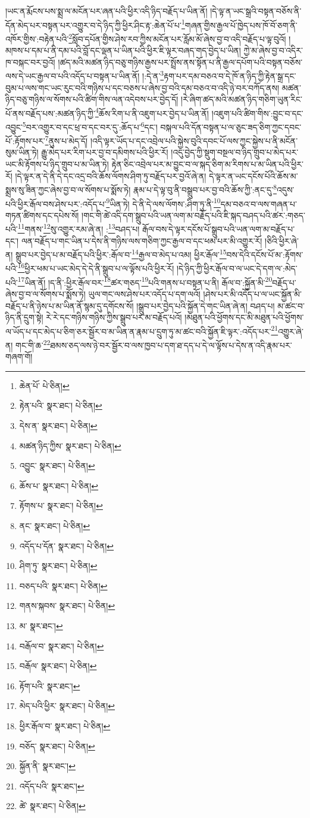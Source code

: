 །ཡང་ན་རྨོངས་པས་སྨྲ་ལ་མངོན་པར་ཞན་པའི་ཕྱིར་འདི་ཉིད་བརྗོད་པ་ཡིན་ནོ། །དེ་ལྟ་ན་ཡང་སྒྲའི་བསྟན་བཅོས་ནི་དོན་མེད་པར་བསྟན་པར་འགྱུར་བ་དེ་ཉིད་ཀྱི་ཕྱིར་ཤིང་རྟ་:ཆེན་པོ་པ་\footnote{ཆེན་པོ་  པེ་ཅིན། }གཞན་གྱིས་རྒྱལ་པོ་ཁྱེད་པས་ཁོ་བོ་ཅག་ནི་འཁོར་གྱིས་:བརྟེན་པའི་\footnote{རྟེན་པའི་  སྣར་ཐང་།  པེ་ཅིན། }སློབ་དཔོན་གྱིས་ཤེས་རབ་ཀྱིས་མངོན་པར་རློམ་མོ་ཞེས་བྱ་བ་འདི་བརྗོད་པ་ལྟ་བུའོ། །མཁས་པ་དམ་པ་ནི་དམ་པའི་བློ་དང་ལྡན་པ་ཡིན་པའི་ཕྱིར་ཇི་ལྟར་བཞད་གད་བྱེད་པ་ཡིན། ཀྱེ་མ་ཞེས་བྱ་བ་འདིར་ཁ་བསྐང་བར་བྱའོ། །ཚད་མའི་མཚན་ཉིད་བཅུ་གཉིས་རྒྱས་པར་སྤྲོས་ནས་སྟོན་པ་ནི་རྒྱལ་དཔོག་པའི་བསྟན་བཅོས་ལས་དེ་ཡང་རྒྱལ་བ་པའི་འདོད་པ་བསྟན་པ་ཡིན་ནོ། །:དེ་ན་\footnote{དེས་ན་  སྣར་ཐང་།  པེ་ཅིན། }རྟག་པར་དམ་བཅའ་བ་དེ་ཁོ་ན་ཉིད་ཀྱི་རྟེན་སྒྲ་དང་བུམ་པ་ལས་གང་ཡང་རུང་བའི་གཉིས་པ་དང་བཅས་པ་ཞེས་བྱ་བའི་དམ་བཅའ་བ་འདི་ཉེ་བར་བཀོད་ནས། མཚན་ཉིད་བཅུ་གཉིས་ལ་སོགས་པའི་ཚིག་གིས་ལན་འདེབས་པར་བྱེད་དོ། །རེ་ཞིག་ཚད་མའི་མཚན་ཉིད་གཅིག་ཡུན་རིང་པོ་ནས་བརྗོད་པས་:མཚན་ཉིད་ཀྱི་\footnote{མཚན་ཉིད་ཀྱིས་  སྣར་ཐང་།  པེ་ཅིན། }ཆོས་རིག་པ་ནི་འཇུག་པར་བྱེད་པ་ཡིན་ནོ། །འཇུག་པའི་ཚིག་གིས་:བྱུང་བ་དང་འབྱུང་\footnote{འབྱུང་  སྣར་ཐང་།  པེ་ཅིན། }བར་འགྱུར་བ་དང་ཕྲ་བ་དང་བར་དུ་:ཆོད་པ་\footnote{ཆོས་པ་  སྣར་ཐང་།  པེ་ཅིན། }དང་། བསྐལ་པའི་དོན་བསྟན་པ་ལ་ཅུང་ཟད་ཅིག་ཀྱང་དབང་པོ་:རྟོགས་པར་\footnote{རྟོགས་པ་  སྣར་ཐང་།  པེ་ཅིན། }ནུས་པ་མེད་དོ། །འདི་ལྟར་ཡོད་པ་དང་འབྲེལ་པའི་སྐྱེས་བུའི་དབང་པོ་ལས་ཀྱང་སྐྱེས་པ་ནི་མངོན་སུམ་ཡིན་ཏེ། རྒྱུ་མེད་པར་རིག་པར་བྱ་བ་དམིགས་པའི་ཕྱིར་རོ། །འདུ་བྱེད་ཀྱི་སྡུག་བསྔལ་བ་ཉིད་གྲུབ་པ་མེད་པར་ཡང་མི་རྟོགས་པ་ཉིད་གྲུབ་པ་མ་ཡིན་ཏེ། རྟེན་ཅིང་འབྲེལ་པར་མ་བྱུང་བ་ལ་སྐད་ཅིག་མ་རིགས་པ་མ་ཡིན་པའི་ཕྱིར་རོ། །དེ་ལྟར་ན་དེ་ནི་དེ་དང་འདྲ་བའི་ཆོས་ལོགས་ཤིག་ཏུ་བརྗོད་པར་བྱའོ་ཞེ་ན། དེ་ལྟར་ན་ཡང་དངོས་པོའི་ཆོས་མ་སྨྲས་སུ་ཟིན་ཀྱང་ཞེས་བྱ་བ་ལ་སོགས་པ་སྨོས་ཏེ། རྣམ་པ་དེ་ལྟ་བུ་ནི་བསྒྲུབ་པར་བྱ་བའི་ཆོས་ཀྱི་:ནང་དུ་\footnote{ནང་  སྣར་ཐང་།  པེ་ཅིན། }འདུས་པའི་ཕྱིར་རྒོལ་བས་ཤེས་པར་:འདོད་པ་\footnote{འདོད་པ་དོན་  སྣར་ཐང་།  པེ་ཅིན། }ཡིན་ཏེ། དེ་ནི་དེ་ལས་ལོགས་:ཤིག་ཏུ་ནི་\footnote{ཤིག་ཏུ་  སྣར་ཐང་།  པེ་ཅིན། }དམ་བཅའ་བ་ལས་གཞན་པ་གཏན་ཚིགས་དང་དཔེས་སོ། །གང་གི་ཚེ་འདི་དག་སྒྲུབ་པའི་ཡན་ལག་མ་བརྗོད་པའི་ཇི་སྐད་བཤད་པའི་ཚར་:གཅད་པའི་\footnote{བཅད་པའི་  སྣར་ཐང་།  པེ་ཅིན། }གནས་\footnote{གནས་སྐབས་  སྣར་ཐང་།  པེ་ཅིན། }སུ་འགྱུར་རམ་ཞེ་ན། :\footnote{མ་  སྣར་ཐང་། }བཤད་པ། རྒོལ་བས་དེ་ལྟར་དངོས་པོ་སྒྲུབ་པའི་ཡན་ལག་མ་བརྗོད་པ་དང་། ལན་བརྗོད་པ་གང་ཡིན་པ་དེས་ནི་གཉིས་ལས་གཅིག་ཀྱང་རྒྱལ་བ་དང་ཕམ་པར་མི་འགྱུར་རོ། །ཅིའི་ཕྱིར་ཞེ་ན། སྒྲུབ་པར་བྱེད་པ་མ་བརྗོད་པའི་ཕྱིར་:རྒོལ་བ་\footnote{བརྒོལ་བ་  སྣར་ཐང་།  པེ་ཅིན། }རྒྱལ་བ་མེད་པ་འམ། ཕྱིར་རྒོལ་\footnote{བརྒོལ་  སྣར་ཐང་།  པེ་ཅིན། }བས་དེའི་དངོས་པོ་མ་:རྟོགས་པའི་\footnote{རྟོག་པའི་  སྣར་ཐང་། }ཕྱིར་ཕམ་པ་ཡང་མེད་དེ་དེ་ནི་སྒྲུབ་པ་ལ་ལྟོས་པའི་ཕྱིར་རོ། །དེ་ཉིད་ཀྱི་ཕྱིར་རྒོལ་བ་ལ་ཡང་དེ་དག་ལ་:མེད་པའི་\footnote{མེད་པའི་ཕྱིར་  སྣར་ཐང་།  པེ་ཅིན། }ཡིན་ནོ། །ད་ནི་:ཕྱིར་རྒོལ་བར་\footnote{ཕྱིར་རྒོལ་བ་  སྣར་ཐང་།  པེ་ཅིན། }ཚར་གཅད་\footnote{བཅོད་  སྣར་ཐང་།  པེ་ཅིན། }པའི་གནས་པ་བསྟན་པ་ནི། རྒོལ་བ་:སྐྱོན་མི་\footnote{སྐྱོན་ནི་  སྣར་ཐང་། }བརྗོད་པ་ཞེས་བྱ་བ་ལ་སོགས་པ་སྨོས་ཏེ། ཡུལ་གང་ལས་ཤེས་པར་འདོད་པ་དག་ལའོ། །ཤེས་པར་མི་འདོད་པ་ལ་ཡང་སྐྱོན་མི་བརྗོད་པ་ནི་ཉེས་པ་མ་ཡིན་ནོ་སྙམ་དུ་དགོངས་སོ། །སྒྲུབ་པར་བྱེད་པའི་སྐྱོན་དེ་གང་ཡིན་ཞེ་ན། བཤད་པ། མ་ཚང་བ་ཉིད་ནི་དྲུག་སྟེ། རེ་རེ་དང་གཉིས་གཉིས་ཀྱིས་སྒྲུབ་པར་མ་བརྗོད་པའོ། །མཐུན་པའི་ཕྱོགས་དང་མི་མཐུན་པའི་ཕྱོགས་ལ་ཡོད་པ་དང་མེད་པ་ཅིག་ཅར་སྦྱོར་བ་མ་ཡིན་ན་རྣམ་པ་དྲུག་ཏུ་མ་ཚང་བའི་སྐྱོན་ཇི་ལྟར་:འདོད་པར་\footnote{འདོད་པའི་  སྣར་ཐང་། }འགྱུར་ཞེ་ན། གང་གི་ཆ་\footnote{ཚེ་  སྣར་ཐང་།  པེ་ཅིན། }ཐམས་ཅད་ལས་ཉེ་བར་སྦྱོར་བ་ལས་ཁྱབ་པ་དག་ཐ་དད་པ་དེ་ལ་ལྟོས་པ་དེས་ན་འདི་རྣམ་པར་གཞག་གོ། 